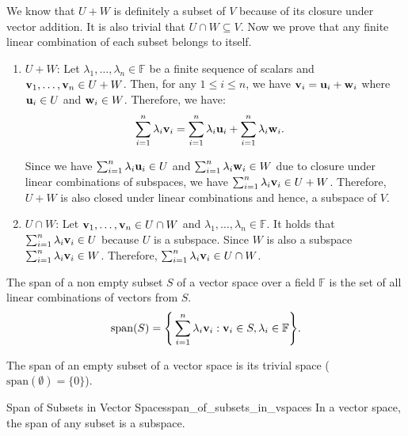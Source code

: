 \begin{proof*}
	We know that $U+W$ is definitely a subset of $V$ because of its closure under vector addition. It is also trivial that $U\cap W\subseteq V$. Now we prove that any finite linear combination of each subset belongs to itself.
	\begin{enumerate}
		\item $U+W$: Let $\lambda_1, \dots, \lambda_n \in \mathbb{F}$ be a finite sequence of scalars and ${\bf v}_1, \dots, {\bf v}_n\in U+W$. Then, for any $1\le i \le n$, we have ${\bf v}_i = {\bf u}_i + {\bf w}_i$ where ${\bf u}_i\in U$ and ${\bf w}_i \in W$. Therefore, we have:
		\begin{align*}
			\sum_{i=1}^n \lambda_i {\bf v}_i &= \sum_{i=1}^n \lambda_i {\bf u}_i + \sum_{i=1}^n \lambda_i {\bf w}_i.
		\end{align*} 

		\noindent Since we have $\sum_{i=1}^n \lambda_i {\bf u}_i\in U$ and $\sum_{i=1}^n \lambda_i {\bf w}_i \in W$ due to closure under linear combinations of subspaces, we have $\sum_{i=1}^n \lambda_i {\bf v}_i \in U+W$. Therefore, $U+W$ is also closed under linear combinations and hence, a subspace of $V$.

		\item $U\cap W$: Let ${\bf v}_1, \dots, {\bf v}_n \in U\cap W$ and $\lambda_1, \dots, \lambda_n\in\mathbb{F}$. It holds that $\sum_{i=1}^n\lambda_i{\bf v}_i \in U$ because $U$ is a subspace. Since $W$ is also a subspace $\sum_{i=1}^n \lambda_i{\bf v}_i \in W$. Therefore, $\sum_{i=1}^n\lambda_i{\bf v}_i\in U\cap W$. 
	\end{enumerate} 
\end{proof*} 

\begin{definition}
	The span of a non empty subset $S$ of a vector space over a field $\mathbb{F}$ is the set of all linear combinations of vectors from $S$.
	\begin{equation}
		\mathrm{span}(S) = \Bigg\{ 
			\sum_{i=1}^n \lambda_i {\bf v}_i : {\bf v}_i \in S, \lambda_i \in\mathbb{F} 
		 \Bigg\}.
	\end{equation} 

	\noindent The span of an empty subset of a vector space is its trivial space ($\mathrm{span}(\emptyset) = \{0\}$).
\end{definition} 

\begin{proposition}{Span of Subsets in Vector Spaces}{span_of_subsets_in_vspaces}
	In a vector space, the span of any subset is a subspace.
\end{proposition} 

